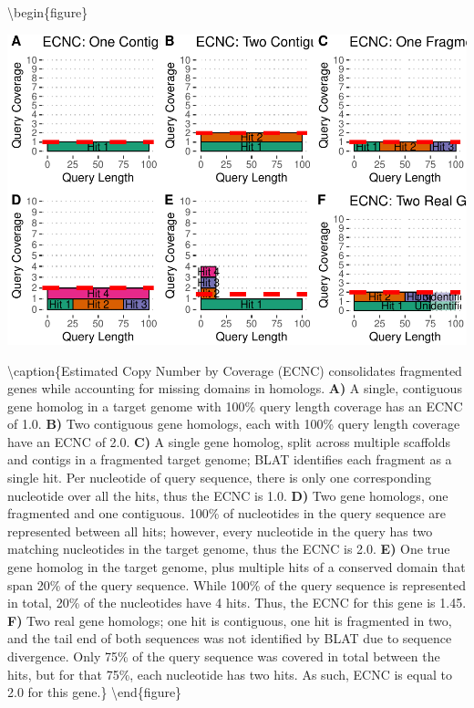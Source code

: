 \documentclass[]{elsarticle} %
\begin{document}
\textbackslash{}begin\{figure\}

\includegraphics[width=6in]{paper_PLOS_draft_files/figure-latex/Figure-ECNC-1} \hfill{}

\textbackslash{}caption\{Estimated Copy Number by Coverage (ECNC) consolidates fragmented genes while accounting for missing domains in homologs. \textbf{A)} A single, contiguous gene homolog in a target genome with 100\% query length coverage has an ECNC of 1.0. \textbf{B)} Two contiguous gene homologs, each with 100\% query length coverage have an ECNC of 2.0. \textbf{C)} A single gene homolog, split across multiple scaffolds and contigs in a fragmented target genome; BLAT identifies each fragment as a single hit. Per nucleotide of query sequence, there is only one corresponding nucleotide over all the hits, thus the ECNC is 1.0. \textbf{D)} Two gene homologs, one fragmented and one contiguous. 100\% of nucleotides in the query sequence are represented between all hits; however, every nucleotide in the query has two matching nucleotides in the target genome, thus the ECNC is 2.0. \textbf{E)} One true gene homolog in the target genome, plus multiple hits of a conserved domain that span 20\% of the query sequence. While 100\% of the query sequence is represented in total, 20\% of the nucleotides have 4 hits. Thus, the ECNC for this gene is 1.45. \textbf{F)} Two real gene homologs; one hit is contiguous, one hit is fragmented in two, and the tail end of both sequences was not identified by BLAT due to sequence divergence. Only 75\% of the query sequence was covered in total between the hits, but for that 75\%, each nucleotide has two hits. As such, ECNC is equal to 2.0 for this gene.\}\label{fig:Figure-ECNC}
\textbackslash{}end\{figure\}
\end{document}
